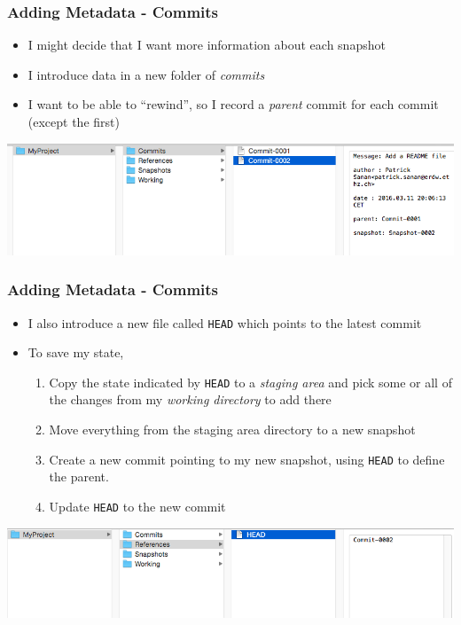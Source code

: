 \documentclass{beamer}
\begin{document}
\begin{frame}[fragile]
\frametitle{Adding Metadata - Commits}
\begin{itemize}
\item I might decide that I want more information about each snapshot
\item I introduce data in a new folder of \emph{commits}
\item I want to be able to ``rewind'', so I record a \emph{parent} commit for each commit (except the first)
\end{itemize}
\includegraphics[scale=0.4]{commit1.png}\\
\end{frame}

\begin{frame}[fragile]
\frametitle{Adding Metadata - Commits}
\begin{itemize}
\item I also introduce a new file called \texttt{HEAD} which points to the latest commit
\item To save my state,
\begin{enumerate}
\item Copy the state indicated by \texttt{HEAD} to a \emph{staging area} and pick some or all of the changes from my \emph{working directory} to add there
\item Move everything from  the staging area directory to a new snapshot
\item Create a new commit pointing to my new snapshot, using \texttt{HEAD} to define the parent.
\item Update \texttt{HEAD} to the new commit
\end{enumerate}
\end{itemize}
\includegraphics[scale=0.4]{commit2.png}
\end{frame}
\end{document}
